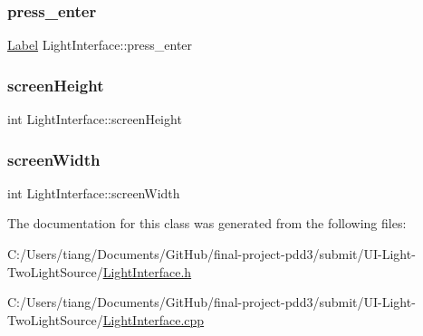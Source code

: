 \mbox{\label{class_light_interface_a7b1d86c00aa815d87dea877b1253ff26}} 
\subsubsection{\texorpdfstring{press\+\_\+enter}{press\_enter}}
{\footnotesize\ttfamily \mbox{\hyperlink{class_label}{Label}} Light\+Interface\+::press\+\_\+enter\hspace{0.3cm}{\ttfamily [private]}}

\mbox{\label{class_light_interface_aa9b68ae929eb75c73308d3a54938fbbb}} 
\subsubsection{\texorpdfstring{screen\+Height}{screenHeight}}
{\footnotesize\ttfamily int Light\+Interface\+::screen\+Height\hspace{0.3cm}{\ttfamily [private]}}

\mbox{\label{class_light_interface_a9277a0dc36c29a260049770cc1178a72}} 
\subsubsection{\texorpdfstring{screen\+Width}{screenWidth}}
{\footnotesize\ttfamily int Light\+Interface\+::screen\+Width\hspace{0.3cm}{\ttfamily [private]}}



The documentation for this class was generated from the following files\+:\begin{DoxyCompactItemize}
\item 
C\+:/\+Users/tiang/\+Documents/\+Git\+Hub/final-\/project-\/pdd3/submit/\+U\+I-\/\+Light-\/\+Two\+Light\+Source/\mbox{\hyperlink{_light_interface_8h}{Light\+Interface.\+h}}\item 
C\+:/\+Users/tiang/\+Documents/\+Git\+Hub/final-\/project-\/pdd3/submit/\+U\+I-\/\+Light-\/\+Two\+Light\+Source/\mbox{\hyperlink{_light_interface_8cpp}{Light\+Interface.\+cpp}}\end{DoxyCompactItemize}
